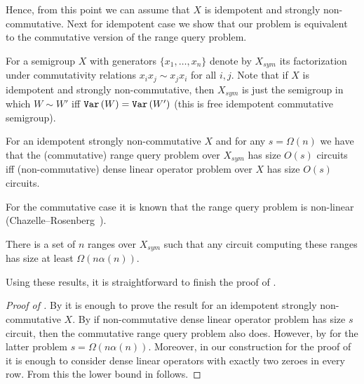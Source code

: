 \documentclass{toc}
\begin{document}
Hence, from this point we can assume that $X$ is idempotent and strongly
non-commutative. Next for idempotent case we show that our problem is equivalent
to the commutative version of the range query problem.

For a semigroup $X$ with generators $\{x_1,\ldots, x_n\}$ denote by $X_{sym}$
its factorization under commutativity relations
$x_i x_j \sim x_j x_i$ for all $i,j$. Note that if $X$ is idempotent and
strongly non-commutative, then $X_{sym}$ is just the semigroup in which
$W \sim W'$ iff $\texttt{Var}\,(W)=\texttt{Var}\,(W')$ (this is free idempotent commutative
semigroup).

\begin{theorem}\label{thm:equivalence}
For an idempotent strongly non-commutative $X$ and for any $s=\Omega(n)$ we have
that the (commutative) 
range query problem
over $X_{sym}$ has size $O(s)$ circuits
iff (non-commutative) dense linear operator problem over $X$ has size $O(s)$
circuits.
\end{theorem}

%
For the commutative case it is known that 
the range query
problem is non-linear
(Chazelle--Rosenberg~\cite{DBLP:journals/ijcga/ChazelleR91}).  %
\begin{theorem}\label{thm:chazelle} 
	There is a set of $n$ ranges over $X_{sym}$ such that any circuit
	computing these ranges has size at least $\Omega(n \alpha(n))$.
\end{theorem}

Using these results, it is straightforward to finish the proof of
.

\begin{proof}[Proof of {}]

By  it is enough to prove the result for an idempotent strongly non-commutative $X$.
By  if non-commutative dense linear
operator problem has size $s$ circuit, then the commutative 
range query
problem also does. However, by  for the latter problem $s=\Omega(n \alpha(n))$.
Moreover, in our construction for the proof of  it
is enough to consider dense linear operators with exactly two zeroes in every
row. From this the lower bound in  follows.
\end{proof}
\end{document}
